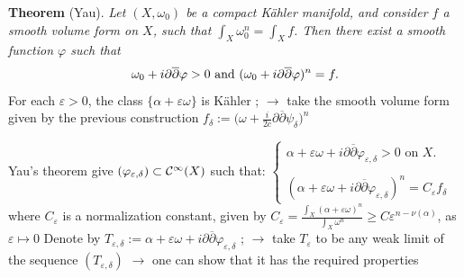 \begin{slide}

\par\vspace{\bigskipamount}\noindent
{\bf Theorem} {(Yau).} {\sl Let $(X, \omega_0)$ be a compact K\"ahler manifold, and consider
$f$ a smooth volume form on $X$, such that $\displaystyle\int_X\omega_0^n= \int_Xf$. 
Then there exist a
smooth function $\varphi$ such that 
$$\omega_0+ i\partial\overline \partial\varphi> 0\hbox{ and }
(\omega_0+ i\partial\overline \partial\varphi)^n= f.$$}
For each $\varepsilon> 0$, the class $\{\alpha+ \varepsilon\omega\}$ is K\"ahler ; 
\vskip 1pt
$\rightarrow$ take 
the smooth volume form given by the previous construction
$\displaystyle f_\delta:= 
\bigl(\omega+ \frac {i}{2c}\partial\overline \partial\psi_{\delta}\bigr)^n$

\vskip 3pt
Yau's theorem give $(\varphi_{\varepsilon, \delta})\subset{\cal C}^\infty(X)$ such that:
$\left\lbrace
\begin{array}{ll} 
\alpha+  \varepsilon\omega+ 
i\partial\overline \partial\varphi_{\varepsilon, \delta}> 0\mbox{ on }X.\\ \\
\displaystyle (\alpha+  \varepsilon\omega+ 
i\partial\overline \partial\varphi_{\varepsilon, \delta})^n= 
C_\varepsilon f_\delta\end{array}\right.$\vskip 1pt
\hskip 0.5cm where $C_\varepsilon$ is a normalization constant, given by
$\displaystyle C_\varepsilon= \frac{\int_X(\alpha+  \varepsilon\omega)^n}{
\int_X\omega^n}
\geq C\varepsilon^{n- \nu(\alpha)}$, as $\varepsilon\mapsto  0$
\vskip 3pt
Denote by $T_{\varepsilon, \delta}:= \alpha+  \varepsilon\omega+ 
i\partial\overline \partial\varphi_{\varepsilon, \delta}$ ; 
\vskip 1pt
$\rightarrow$ take $T_\varepsilon$ to be 
any weak limit of the sequence $(T_{\varepsilon, \delta})$ 
\vskip 1pt
$\rightarrow$ one can show that 
it has the required properties
\end{slide}


